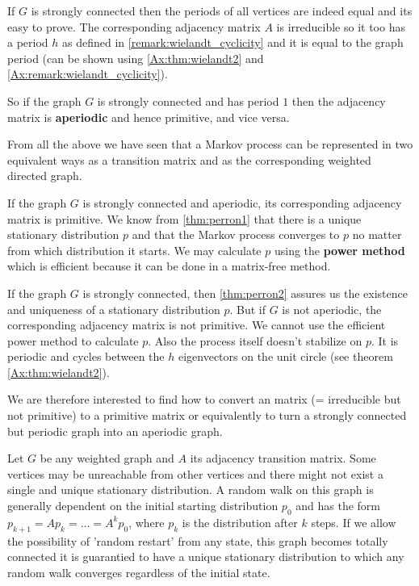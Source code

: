 \begin{remark}
\label{remark:periods}
If $G$ is strongly connected then the periods of all vertices are indeed equal
and its easy to prove. The corresponding adjacency matrix $A$ is irreducible so
it too has a period $h$ as defined in \ref{remark:wielandt_cyclicity} and it is
equal to the graph period (can be shown using \ref{Ax:thm:wielandt2} and
\ref{Ax:remark:wielandt_cyclicity}).

So if the graph $G$ is strongly connected and has period $1$
then the adjacency matrix is \textbf{aperiodic} and hence primitive, and vice versa. 
\end{remark}

From all the above we have seen that a Markov process can be represented in two
equivalent ways \textemdash as a transition matrix  and as the 
corresponding weighted directed graph.

If the graph $G$ is strongly connected and aperiodic, its corresponding
adjacency matrix is primitive. We know from \ref{thm:perron1} that there is a
unique stationary distribution $p$ and that the Markov process converges to $p$ no
matter from which distribution it starts. We may calculate $p$ using the
\textbf{power
method} which is efficient because it can be done in a matrix-free method. 

If the graph $G$ is strongly connected, then \ref{thm:perron2} assures us the
existence and uniqueness of a stationary distribution $p$. But if $G$ is not
aperiodic, the corresponding adjacency matrix is not primitive. We cannot use
the efficient power method to calculate $p$. Also the process itself doesn't
stabilize on $p$. It is periodic and cycles between the $h$ eigenvectors on
the unit circle (see theorem \ref{Ax:thm:wielandt2}). 

We are therefore interested to find how to convert an 
matrix (= irreducible but not primitive)
to a primitive matrix or equivalently to turn a strongly connected but periodic graph
into an aperiodic graph.

Let $G$ be any weighted graph and $A$ its adjacency transition matrix. Some vertices may
be unreachable from other vertices and there might not exist a single and
unique stationary distribution.
A random walk on this graph is generally
dependent on the initial starting distribution $p_0$ and has the
form $p_{k+1} = Ap_k = \dots = A^k p_0$, where $p_k$ is the
distribution after $k$ steps.
If we allow the possibility of 'random restart' from any state, this
graph becomes totally connected it is guarantied to have a unique stationary
distribution to which any random walk converges regardless of the initial state.

